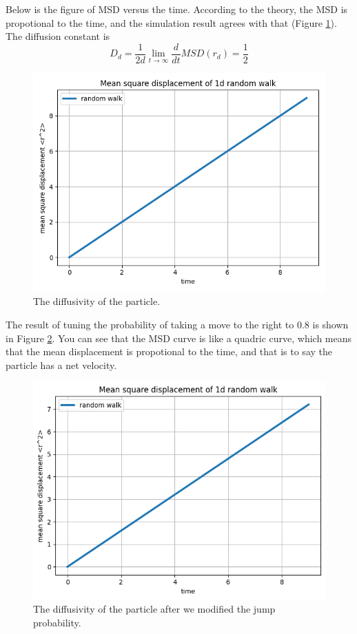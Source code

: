 \documentclass{assignmeownt}
\begin{document}
Below is the figure of MSD versus the time. According to the theory, the MSD is propotional to the time, and the simulation result agrees with that (Figure \ref{fig:diffusivity_random_walk}). The diffusion constant is
$$
D_d = \frac{1}{2d}\lim_{t\rightarrow \infty}\frac{d}{dt}MSD(r_d)=\frac{1}{2}
$$

\begin{figure}
  \centering
  \includegraphics[width=0.5\linewidth]{../block1/4-RandomWalk1D/Results/Figure_2.png}
  \caption{The diffusivity of the particle.}
  \label{fig:diffusivity_random_walk}
\end{figure}
The result of tuning the probability of taking a move to the right to 0.8 is shown in Figure \ref{fig:diffusivity_random_walk_impeded}. You can see that the MSD curve is like a quadric curve, which means that the mean displacement is propotional to the time, and that is to say the particle has a net velocity.

\begin{figure}
  \centering
  \includegraphics[width=0.5\linewidth]{../block1/4-RandomWalk1D/Results/Figure_4.png}
  \caption{The diffusivity of the particle after we modified the jump probability.}
  \label{fig:diffusivity_random_walk_impeded}
\end{figure}
\end{document}
